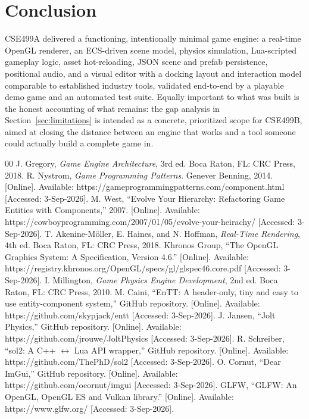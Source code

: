 \documentclass[conference]{IEEEtran}
\begin{document}
\section{Conclusion}

CSE499A delivered a functioning, intentionally minimal game engine: a
real-time OpenGL renderer, an ECS-driven scene model, physics
simulation, Lua-scripted gameplay logic, asset hot-reloading, JSON scene
and prefab persistence, positional audio, and a visual editor with a
docking layout and interaction model comparable to established industry
tools, validated end-to-end by a playable demo game and an automated
test suite. Equally important to what was built is the honest accounting
of what remains: the gap analysis in Section~\ref{sec:limitations} is
intended as a concrete, prioritized scope for CSE499B, aimed at closing
the distance between an engine that works and a tool someone could
actually build a complete game in.

\begin{thebibliography}{00}
 J. Gregory, \emph{Game Engine Architecture}, 3rd ed. Boca Raton, FL: CRC Press, 2018.
 R. Nystrom, \emph{Game Programming Patterns}. Genever Benning, 2014. [Online]. Available: https://gameprogrammingpatterns.com/component.html [Accessed: 3-Sep-2026].
 M. West, ``Evolve Your Hierarchy: Refactoring Game Entities with Components,'' 2007. [Online]. Available: https://cowboyprogramming.com/2007/01/05/evolve-your-heirachy/ [Accessed: 3-Sep-2026].
 T. Akenine-M{\"o}ller, E. Haines, and N. Hoffman, \emph{Real-Time Rendering}, 4th ed. Boca Raton, FL: CRC Press, 2018.
 Khronos Group, ``The OpenGL Graphics System: A Specification, Version 4.6.'' [Online]. Available: https://registry.khronos.org/OpenGL/specs/gl/glspec46.core.pdf [Accessed: 3-Sep-2026].
 I. Millington, \emph{Game Physics Engine Development}, 2nd ed. Boca Raton, FL: CRC Press, 2010.
 M. Caini, ``EnTT: A header-only, tiny and easy to use entity-component system,'' GitHub repository. [Online]. Available: https://github.com/skypjack/entt [Accessed: 3-Sep-2026].
 J. Jansen, ``Jolt Physics,'' GitHub repository. [Online]. Available: https://github.com/jrouwe/JoltPhysics [Accessed: 3-Sep-2026].
 R. Schreiber, ``sol2: A C++ $\leftrightarrow$ Lua API wrapper,'' GitHub repository. [Online]. Available: https://github.com/ThePhD/sol2 [Accessed: 3-Sep-2026].
 O. Cornut, ``Dear ImGui,'' GitHub repository. [Online]. Available: https://github.com/ocornut/imgui [Accessed: 3-Sep-2026].
 GLFW, ``GLFW: An OpenGL, OpenGL ES and Vulkan library.'' [Online]. Available: https://www.glfw.org/ [Accessed: 3-Sep-2026].
\end{thebibliography}
\end{document}
